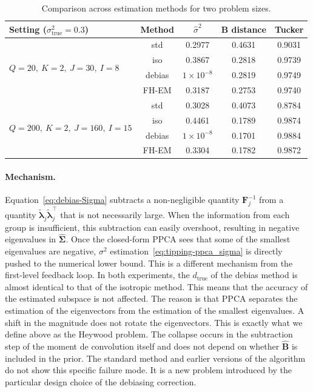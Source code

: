 \begin{table}[H]
\centering
\begin{tabular}{lcccc}
\toprule
Setting ($\sigma^{2}_{\text{true}}=0.3$) & Method & $\hat\sigma^2$ & B distance & Tucker \\
\midrule
\multirow{4}{*}{$Q=20,\ K=2,\ J=30,\ I=8$}
 & std    & 0.2977 & 0.4631 & 0.9031 \\
 & iso    & 0.3867 & 0.2818 & 0.9739 \\
 & debias & $1\times10^{-8}$ & 0.2819 & 0.9749 \\
 & FH-EM   & 0.3187 & 0.2753 & 0.9740 \\
\midrule
\multirow{4}{*}{$Q=200,\ K=2,\ J=160,\ I=15$}
 & std    & 0.3028 & 0.4073 & 0.8784 \\
 & iso    & 0.4461 & 0.1789 & 0.9874 \\
 & debias & $1\times 10^{-8}$ & 0.1701 & 0.9884 \\
 & FH-EM   & 0.3304 & 0.1782 & 0.9872 \\
\bottomrule
\end{tabular}
\caption{Comparison across estimation methods for two problem sizes.}
\label{tab:method-comparison}
\end{table}

\paragraph*{Mechanism.} Equation~\ref{eq:debias-Sigma} subtracts a non-negligible quantity $\mathbf{F}_{j}^{-1}$ from a quantity $\tilde{\bm{\lambda}}_{j}\tilde{\bm{\lambda}}_{j}^{\top}$ that is not necessarily large. When the information from each group is insufficient, this subtraction can easily overshoot, resulting in negative eigenvalues in $\hat{\bm{\Sigma}}$. Once the closed-form PPCA sees that some of the smallest eigenvalues are negative, $\sigma^{2}$ estimation~\eqref{eq:tipping-ppca_sigma} is directly pushed to the numerical lower bound. This is a different mechanism from the first-level feedback loop. In both experiments, the $d_{\mathrm{true}}$ of the debias method is almost identical to that of the isotropic method. This means that the accuracy of the estimated subspace is not affected. The reason is that PPCA separates the estimation of the eigenvectors from the estimation of the smallest eigenvalues. A shift in the magnitude does not rotate the eigenvectors. This is exactly what we define above as the Heywood problem. The collapse occurs in the subtraction step of the moment de convolution itself and does not depend on whether $\hat{\mathbf{B}}$ is included in the prior. The standard method and earlier versions of the algorithm do not show this specific failure mode. It is a new problem introduced by the particular design choice of the debiasing correction.

